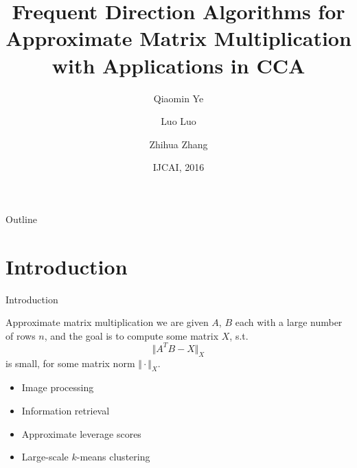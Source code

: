 \documentclass{beamer}
\title[FD-AMM]{Frequent Direction Algorithms for Approximate Matrix Multiplication with Applications in CCA}
\author{Qiaomin Ye \and Luo Luo \and Zhihua Zhang}
\institute[] %
{
  Department of Computer Science and Engineering \\
  Shanghai Jiao Tong University
  }
\date{IJCAI, 2016}
\begin{document}
\begin{frame}
  \titlepage
\end{frame}

\begin{frame}{Outline}
  \tableofcontents
\end{frame}

\section{Introduction}



\begin{frame}{Introduction}
	          
	  
		\begin{block}{Approximate matrix multiplication}
			we are given $A$, $B$ each with a large number of rows $n$, and the goal is to compute some matrix $X$, s.t. 
			$$\Vert A^TB - X \Vert_X$$ %
			is small, for some matrix norm $\Vert \cdot  \Vert_X$. 
		\end{block}
		\pause
		
  \begin{itemize}
  \item {
    Image processing
  }
  \item {
     Information retrieval
  }
  \item{
  	Approximate leverage scores
  	 }
  	 \item { 
  	 	Large-scale $k$-means clustering
  	 	}
  \end{itemize}
  
\end{frame}
\end{document}
